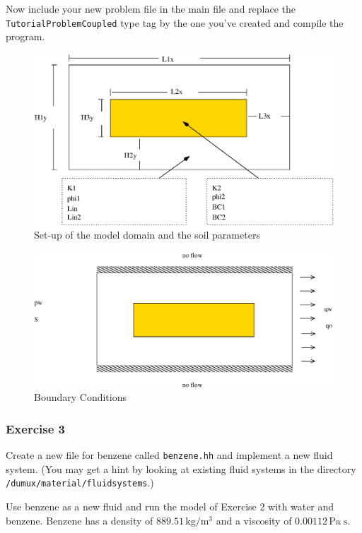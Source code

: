 Now include your new problem file in the main file and replace the
\texttt{TutorialProblemCoupled} type tag by the one you've created and
compile the program.


\begin{figure}[h]
\centering
\includegraphics[width=0.8\linewidth,keepaspectratio]{EPS/Ex2_Domain.eps}
\caption{Set-up of the model domain and the soil parameters}\label{tutorial-coupled:ex2_Domain}
\end{figure}

\begin{figure}[h]
\centering
\includegraphics[width=0.8\linewidth,keepaspectratio]{EPS/Ex2_Boundary.eps}
\caption{Boundary Conditions}\label{tutorial-coupled:ex2_BC}
\end{figure}

\subsubsection{Exercise 3}

Create a new file for benzene called \texttt{benzene.hh} and implement
a new fluid system. (You may get a hint by looking at existing fluid 
systems in the directory \verb+/dumux/material/fluidsystems+.)

Use benzene as a new fluid and run the model of Exercise 2 with water
and benzene. Benzene has a density of $889.51 \, \text{kg} / \text{m}^3$
and a viscosity of $0.00112 \, \text{Pa} \; \text{s}$. 

